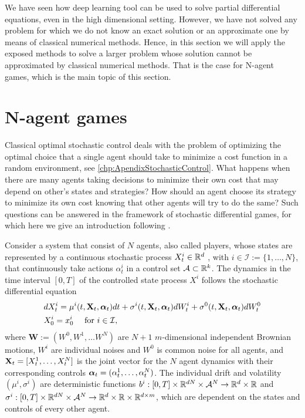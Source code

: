 We have seen how deep learning tool can be used to solve partial differential equations, even in the high dimensional setting. However, we have not solved any problem for which we do not know an exact solution or an approximate one by means of classical numerical methods. Hence, in this section we will apply the exposed methods to solve a larger problem whose solution cannot be approximated by classical numerical methods. That is the case for N-agent games, which is the main topic of this section. 
\section{N-agent games}
Classical optimal stochastic control deals with the problem of optimizing the optimal choice that a single agent should take to minimize a cost function in a random environment, see \autoref{chp:ApendixStochasticControl}.  What happens when there are many agents taking decisions to minimize their own cost that may depend on other's states and strategies? How should an agent choose its strategy to minimize its own cost knowing that other agents will try to do the same?  Such questions can be answered in the framework of stochastic differential games, for which here we give an introduction following \cite{hu_recent_nodate,han_deep_2020}.

Consider a system that consist of $N$ agents, also called players, whose states are represented by a continuous stochastic process $X^{i}_{t}\in \mathbb{R}^d$ , with $i\in \mathcal{I}:=\{1,\ldots, N\}$, that continuously take actions $\alpha_{t}^{i}$ in a control set $\mathcal{A}\subset \mathbb{R}^k$. The dynamics in the time interval $[0,T]$ of the controlled state process $X^i$ follows the stochastic differential equation
\begin{equation}
	\begin{split}
		&dX_t^{i}=\mu^{i}(t,\mathbf{X}_t,\bm{\alpha}_t)dt+\sigma^{i}(t,\mathbf{X}_t,\bm{\alpha}_t)dW_t^{i}+\sigma^{0}(t,\mathbf{X}_t,\bm{\alpha}_t)dW_{t}^0\\
		&X_{0}^{i}=x_{0}^{i} \quad \text{ for } i\in \mathcal{I},
	\end{split}
\end{equation}
where $\mathbf{W}:=(W^0,W^1,\ldots W^N)$ are $N+1$ $m$-dimensional independent Brownian motions, $W^{i}$ are individual noises and $W^0$ is common noise for all agents, and $\mathbf{X}_t=[X_t^1,\ldots,X_t^N]$ is the joint vector for the $N$ agent dynamics with their corresponding controls $\bm{\alpha}_t=(\alpha_t^1,\ldots,\alpha_t^N)$. The individual drift and volatility $(\mu^i,\sigma^i)$ are deterministic functions $b^{i}:[0,T]\times \mathbb{R}^{dN}\times \mathcal{A}^N\to \mathbb{R}^d\times \mathbb{R}$ and $\sigma^{i}:[0,T]\times \mathbb{R}^{dN}\times \mathcal{A}^N\to \mathbb{R}^d\times \mathbb{R}\times\mathbb{R}^{d\times m}$, which are dependent on the states and controls of every other agent.

